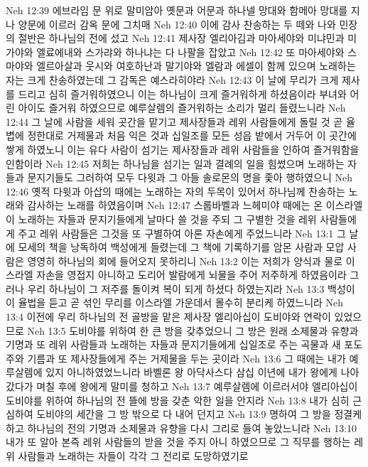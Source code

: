 Neh 12:39  에브라임 문 위로 말미암아 옛문과 어문과 하나넬 망대와 함메아 망대를 지나 양문에 이르러 감옥 문에 그치매
Neh 12:40  이에 감사 찬송하는 두 떼와 나와 민장의 절반은 하나님의 전에 섰고
Neh 12:41  제사장 엘리아김과 마아세야와 미냐민과 미가야와 엘료에내와 스가랴와 하나냐는 다 나팔을 잡았고
Neh 12:42  또 마아세야와 스마야와 엘르아살과 웃시와 여호하난과 말기야와 엘람과 에셀이 함께 있으며 노래하는 자는 크게 찬송하였는데 그 감독은 예스라히야라
Neh 12:43  이 날에 무리가 크게 제사를 드리고 심히 즐거워하였으니 이는 하나님이 크게 즐거워하게 하셨음이라 부녀와 어린 아이도 즐거워 하였으므로 예루살렘의 즐거워하는 소리가 멀리 들렸느니라
Neh 12:44  그 날에 사람을 세워 곳간을 맡기고 제사장들과 레위 사람들에게 돌릴 것 곧 율볍에 정한대로 거제물과 처음 익은 것과 십일조를 모든 성읍 밭에서 거두어 이 곳간에 쌓게 하였노니 이는 유다 사람이 섬기는 제사장들과 레위 사람들을 인하여 즐거워함을 인함이라
Neh 12:45  저희는 하나님을 섬기는 일과 결례의 일을 힘썼으며 노래하는 자들과 문지기들도 그러하여 모두 다윗과 그 아들 솔로몬의 명을 좇아 행하였으니
Neh 12:46  옛적 다윗과 아삽의 때에는 노래하는 자의 두목이 있어서 하나님께 찬송하는 노래와 감사하는 노래를 하였음이며
Neh 12:47  스룹바벨과 느헤미야 때에는 온 이스라엘이 노래하는 자들과 문지기들에게 날마다 쓸 것을 주되 그 구별한 것을 레위 사람들에게 주고 레위 사람들은 그것을 또 구별하여 아론 자손에게 주었느니라
Neh 13:1  그 날에 모세의 책을 낭독하여 백성에게 들렸는데 그 책에 기록하기를 암몬 사람과 모압 사람은 영영히 하나님의 회에 들어오지 못하리니
Neh 13:2  이는 저희가 양식과 물로 이스라엘 자손을 영접지 아니하고 도리어 발람에게 뇌물을 주어 저주하게 하였음이라 그러나 우리 하나님이 그 저주를 돌이켜 복이 되게 하셨다 하였는지라
Neh 13:3  백성이 이 율법을 듣고 곧 섞인 무리를 이스라엘 가운데서 몰수히 분리케 하였느니라
Neh 13:4  이전에 우리 하나님의 전 골방을 맡은 제사장 엘리아십이 도비야와 연락이 있었으므로
Neh 13:5  도비야를 위하여 한 큰 방을 갖추었으니 그 방은 원래 소제물과 유향과 기명과 또 레위 사람들과 노래하는 자들과 문지기들에게 십일조로 주는 곡물과 새 포도주와 기름과 또 제사장들에게 주는 거제물을 두는 곳이라
Neh 13:6  그 때에는 내가 예루살렘에 있지 아니하였었느니라 바벨론 왕 아닥사스다 삼십 이년에 내가 왕에게 나아갔다가 며칠 후에 왕에게 말미를 청하고
Neh 13:7  예루살렘에 이르러서야 엘리아십이 도비야를 위하여 하나님의 전 뜰에 방을 갖춘 악한 일을 안지라
Neh 13:8  내가 심히 근심하여 도비야의 세간을 그 방 밖으로 다 내어 던지고
Neh 13:9  명하여 그 방을 정결케 하고 하나님의 전의 기명과 소제물과 유향을 다시 그리로 들여 놓았느니라
Neh 13:10  내가 또 알아 본즉 레위 사람들의 받을 것을 주지 아니 하였으므로 그 직무를 행하는 레위 사람들과 노래하는 자들이 각각 그 전리로 도망하였기로
